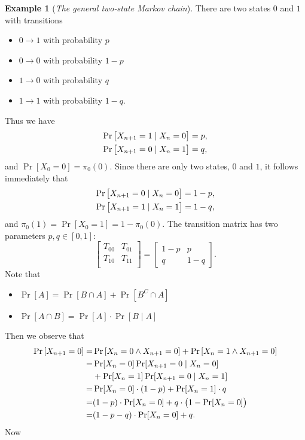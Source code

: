 \documentclass[12pt,openany]{book}
\theoremstyle{definition}
\newtheorem{example}{Example}[chapter]
\begin{document}
	\begin{example}[\textit{The general two-state Markov chain}]
		There are two states $0$ and $1$ with transitions \begin{itemize}
			\item $0\to 1$ with probability $p$
			\item $0\to 0$ with probability $1-p$
			\item $1\to 0$ with probability $q$
			\item $1\to 1$ with probability $1-q$.
		\end{itemize} Thus we have \begin{align*}
		\Pr\sbr{X_{n+1}=1\mid X_n=0} &=p,\\
		\Pr\sbr{X_{n+1}=0\mid X_n=1} &=q,
	\end{align*} and $\Pr[X_0=0]=\pi_0(0)$. Since there are only two states, $0$ and $1$, it follows immediately that \begin{align*}
	\Pr\sbr{X_{n+1}=0\mid X_n=0}=1-p,\\
	\Pr\sbr{X_{n+1}=1\mid X_n=1}=1-q,
\end{align*} and $\pi_0(1)=\Pr[X_0=1]=1-\pi_0(0)$. The transition matrix has two parameters $p,q\in[0,1]$: \[
	\begin{bmatrix}
		T_{00} & T_{01}\\
		T_{10} & T_{11}\\
	\end{bmatrix}=\begin{bmatrix}
	1-p & p\\
	q & 1-q
\end{bmatrix}.
	\] Note that \begin{itemize}
		\item $\Pr[A]=\Pr[B\cap A]+\Pr[B^C\cap A]$
		\item $\Pr[A\cap B]=\Pr[A]\cdot\Pr[B\mid A]$
	\end{itemize} Then we observe that \begin{align*}
		\Pr\sbr{X_{n+1}=0}=&\Pr\sbr{X_n=0\land X_{n+1}=0}+\Pr\sbr{X_n=1\land X_{n+1}=0}\\
		=&\Pr[X_n=0]\Pr[X_{n+1}=0\mid X_n=0]\\
		&+\Pr[X_n=1]\Pr[X_{n+1}=0\mid X_n=1]\\
		=&\Pr[X_n=0]\cdot (1-p)+\Pr[X_n=1]\cdot q\\
		=&(1-p)\cdot \Pr[X_n=0]+q\cdot \del{1-\Pr[X_n=0]}\\
		=&(1-p-q)\cdot\Pr[X_n=0]+q.
	\end{align*} Now \begin{align*}

\end{align*}
\end{example}
\end{document}
